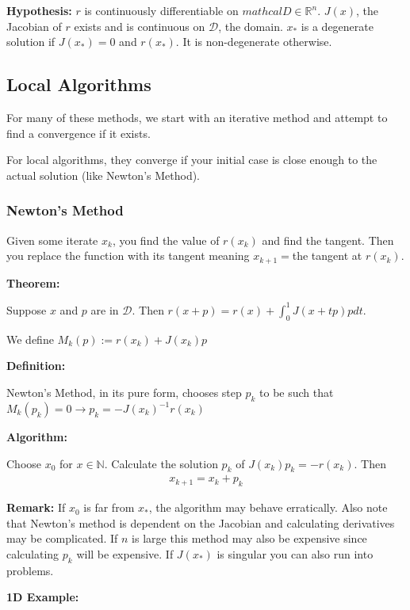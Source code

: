 \documentclass{article}
\newcommand{\n}{\newline}
\begin{document}
	\textbf{Hypothesis:} $r$ is continuously differentiable on $mathcal{D}\in\mathbb{R}^{n}$.  $J(x)$, the Jacobian of $r$ exists and is continuous on $\mathcal{D}$, the domain. $x_{*}$ is a degenerate solution if $J(x_{*})=0$ and $r(x_{*})$.  It is non-degenerate otherwise.\n 
	
	\subsection{Local Algorithms}
	For many of these methods, we start with an iterative method and attempt to find a convergence if it exists.
	
	For local algorithms, they converge if your initial case is close enough to the actual solution (like Newton's Method).
	
	\subsubsection{Newton's Method}
	
	Given some iterate $x_{k}$, you find the value of $r(x_{k})$ and find the tangent.  Then you replace the function with its tangent meaning $x_{k+1}=$the tangent at $r(x_k)$.  
	
	\textbf{Theorem:\n}
	
	Suppose $x$ and $p$ are in $\mathcal{D}$.  Then $r(x+p)=r(x)+\int_{0}^{1}J(x+tp)pdt$.\n
	
	We define $M_{k}(p):=r(x_k)+J(x_k)p$\n
	
	\textbf{Definition:\n}
	
	Newton's Method, in its pure form, chooses step $p_{k}$ to be such that $M_{k}(p_{k})=0\rightarrow p_{k}=-J(x_{k})^{-1}r(x_{k})$\n
	
	\textbf{Algorithm:\n}
	
	Choose $x_{0}$ for $x\in\mathbb{N}$.  Calculate the solution $p_{k}$ of $J(x_{k})p_{k}=-r(x_{k})$.  Then
	\begin{align*}
		x_{k+1}=x_k+p_{k}
	\end{align*}  
	
	\textbf{Remark:} If $x_{0}$ is far from $x_{*}$, the algorithm may behave erratically.  Also note that Newton's method is dependent on the Jacobian and calculating derivatives may be complicated.  If $n$ is large this method may also be expensive since calculating $p_{k}$ will be expensive.  If $J(x_{*})$ is singular you can also run into problems.\n
	
	\textbf{1D Example:\n}
	
\end{document}
